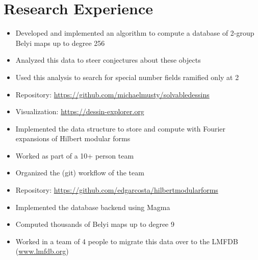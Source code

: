 \documentclass[a4paper]{adcv}
\begin{document}
\section{Research Experience}{
  \begin{adcvtabletwo}
      \vspace{-10pt}
      \begin{itemize}
        \item
          Developed and implemented an algorithm to compute
          a database of 2-group Belyi maps up to degree 256
        \item
          Analyzed this data to steer conjectures about these objects
        \item
          Used this analysis to search for special number fields
          ramified only at 2
        \item
          Repository: \url{https://github.com/michaelmusty/solvabledessins}
        \item
          Visualization: \url{https://dessin-explorer.org}
      \end{itemize}
    \adcvrowskip
      \vspace{-10pt}
      \begin{itemize}
        \item
          Implemented the data structure to store
          and compute with Fourier expansions of Hilbert modular forms
        \item
          Worked as part of a 10+ person team
        \item
          Organized the (git) workflow of the team
        \item
          Repository: \url{https://github.com/edgarcosta/hilbertmodularforms}
      \end{itemize}
    \adcvrowskip
      \vspace{-10pt}
      \begin{itemize}
        \item
          Implemented the database backend using Magma
        \item
          Computed thousands of Belyi maps up to degree 9
        \item
          Worked in a team of 4 people to migrate this data over
          to the LMFDB (\url{www.lmfdb.org})

\end{itemize}
\end{adcvtabletwo}}
\end{document}

